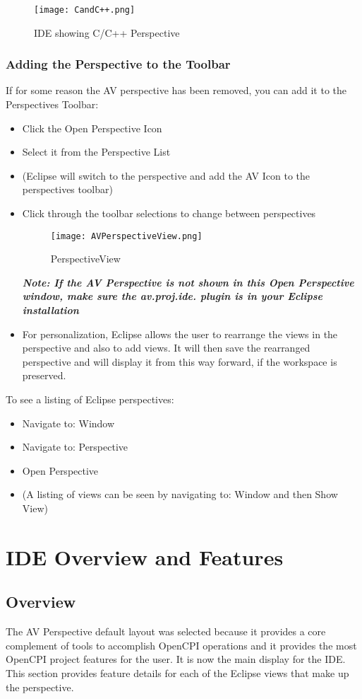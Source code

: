 \begin{figure}[h!]
\centering
\caption{IDE showing C/C++ Perspective}\label{fig:IDE_CandC++Perspective}
	\texttt{[image: CandC++.png]}
\end{figure}
\subsubsection{Adding the Perspective to the Toolbar}
If for some reason the AV perspective has been removed, you can add it to the Perspectives Toolbar:
\begin{itemize}
\item Click the Open Perspective Icon
\item Select it from the Perspective List
\item[](Eclipse will switch to the perspective and add the AV Icon to the perspectives toolbar)
\item Click through the toolbar selections to change between perspectives\\
\begin{figure}[h!]
  \centering
  \caption{PerspectiveView}\label{fig:Perspective View}
    \texttt{[image: AVPerspectiveView.png]}
\end{figure}


\textbf{\emph{Note: If the AV Perspective is not shown in this Open Perspective window, make sure the \textbf{av.proj.ide. plugin} is in your Eclipse installation}}
\item[]For personalization, Eclipse allows the user to rearrange the views in the perspective and also to add views. It will then save the rearranged perspective and will display it from this way forward, if the workspace is preserved.
\end{itemize}
To see a listing of Eclipse perspectives:
\begin{itemize}
\item Navigate to: Window
\item Navigate to: Perspective
\item Open Perspective
\item[] (A listing of views can be seen by navigating to: Window and then Show View)
\end{itemize}
\section{IDE Overview and Features}
\subsection{Overview}
The AV Perspective default layout was selected because it provides a core complement of tools to accomplish OpenCPI operations and it provides the most OpenCPI project features for the user. It is now the main display for the IDE. This section provides feature details for each of the Eclipse views that make up the perspective.
